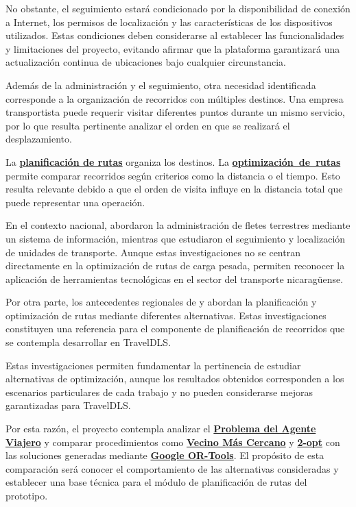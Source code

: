 No obstante, el seguimiento estará condicionado por la disponibilidad de conexión a Internet, los permisos de localización y las características de los dispositivos utilizados. Estas condiciones deben considerarse al establecer las funcionalidades y limitaciones del proyecto, evitando afirmar que la plataforma garantizará una actualización continua de ubicaciones bajo cualquier circunstancia.

Además de la administración y el seguimiento, otra necesidad identificada corresponde a la organización de recorridos con múltiples destinos. Una empresa transportista puede requerir visitar diferentes puntos durante un mismo servicio, por lo que resulta pertinente analizar el orden en que se realizará el desplazamiento.

La \textbf{\hyperlink{concepto-planificacion-rutas}{planificación de rutas}} organiza los destinos. La \mbox{\textbf{\hyperlink{concepto-optimizacion-rutas}{optimización de rutas}}} permite comparar recorridos según criterios como la distancia o el tiempo. Esto resulta relevante debido a que el orden de visita influye en la distancia total que puede representar una operación.


En el contexto nacional, \textcite{aragon2018implementacion}
abordaron la administración de fletes terrestres mediante
un sistema de información, mientras que
\textcite{garcia2022desarrollo} estudiaron el seguimiento
y localización de unidades de transporte. Aunque estas
investigaciones no se centran directamente en la
optimización de rutas de carga pesada, permiten
reconocer la aplicación de herramientas tecnológicas
en el sector del transporte nicaragüense.

Por otra parte, los antecedentes regionales de
\textcite{aguilar2022optimizacion} y
\textcite{hernandez2024evaluacion} abordan la
planificación y optimización de rutas mediante
diferentes alternativas. Estas investigaciones
constituyen una referencia para el componente de
planificación de recorridos que se contempla
desarrollar en TravelDLS.


Estas investigaciones permiten fundamentar la pertinencia de estudiar alternativas de optimización, aunque los resultados obtenidos corresponden a los escenarios particulares de cada trabajo y no pueden considerarse mejoras garantizadas para TravelDLS.

Por esta razón, el proyecto contempla analizar el \textbf{\hyperlink{concepto-tsp}{Problema del Agente Viajero}} y comparar procedimientos como \textbf{\hyperlink{concepto-vecino-mas-cercano}{Vecino Más Cercano}} y \textbf{\hyperlink{concepto-dos-opt}{2-opt}} con las soluciones generadas mediante \textbf{\hyperlink{concepto-ortools}{Google OR-Tools}}. El propósito de esta comparación será conocer el comportamiento de las alternativas consideradas y establecer una base técnica para el módulo de planificación de rutas del prototipo.

